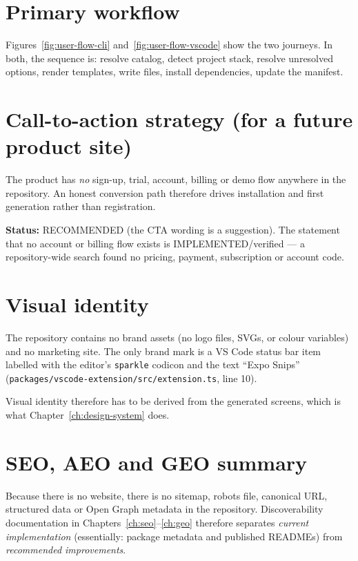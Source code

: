 \section{Primary workflow}

Figures~\ref{fig:user-flow-cli} and~\ref{fig:user-flow-vscode} show the two
journeys. In both, the sequence is: resolve catalog, detect project stack,
resolve unresolved options, render templates, write files, install dependencies,
update the manifest.

\section{Call-to-action strategy (for a future product site)}

The product has \emph{no} sign-up, trial, account, billing or demo flow anywhere
in the repository. An honest conversion path therefore drives installation and
first generation rather than registration.

\textbf{Status:} RECOMMENDED (the CTA wording is a suggestion). The statement
that no account or billing flow exists is IMPLEMENTED/verified --- a repository-wide
search found no pricing, payment, subscription or account code.

\section{Visual identity}

The repository contains no brand assets (no logo files, SVGs, or colour
variables) and no marketing site. The only brand mark is a VS Code status bar item
labelled with the editor's \texttt{sparkle} codicon and the text ``Expo Snips''
(\texttt{packages/vscode-extension/src/extension.ts}, line 10).

Visual identity therefore has to be derived from the generated screens, which is
what Chapter~\ref{ch:design-system} does.

\section{SEO, AEO and GEO summary}

Because there is no website, there is no sitemap, robots file, canonical URL,
structured data or Open Graph metadata in the repository. Discoverability
documentation in Chapters~\ref{ch:seo}--\ref{ch:geo} therefore separates
\emph{current implementation} (essentially: package metadata and published
READMEs) from \emph{recommended improvements}.

